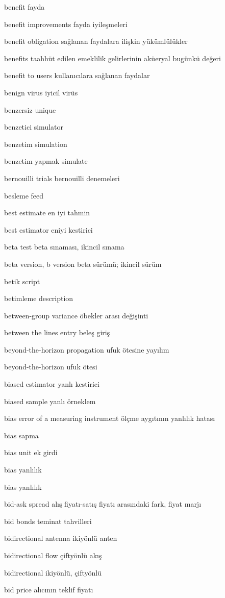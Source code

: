 \documentclass[12pt,fleqn]{article}\usepackage{../../common}
\begin{document}
benefit fayda

benefit improvements fayda iyileşmeleri

benefit obligation sağlanan faydalara ilişkin yükümlülükler

benefits taahhüt edilen emeklilik gelirlerinin aküeryal bugünkü değeri

benefit to users kullanıcılara sağlanan faydalar

benign virus iyicil virüs

benzersiz unique

benzetici simulator

benzetim simulation

benzetim yapmak simulate

bernouilli trials bernouilli denemeleri

besleme feed

best estimate en iyi tahmin

best estimator eniyi kestirici

beta test beta sınaması, ikincil sınama

beta version, b version beta sürümü; ikincil sürüm

betik script

betimleme description

between-group variance öbekler arası değişinti

between the lines entry beleş giriş

beyond-the-horizon propagation ufuk ötesine yayılım

beyond-the-horizon ufuk ötesi

biased estimator yanlı kestirici

biased sample yanlı örneklem

bias error of a measuring instrument ölçme aygıtının yanlılık hatası

bias sapma

bias unit ek girdi

bias yanlılık

bias yanlılık

bid-ask spread alış fiyatı-satış fiyatı arasındaki fark, fiyat marjı

bid bonds teminat tahvilleri

bidirectional antenna ikiyönlü anten

bidirectional flow çiftyönlü akış

bidirectional ikiyönlü, çiftyönlü

bid price alıcının teklif fiyatı
\end{document}
